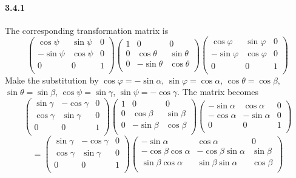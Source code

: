\documentclass[a4paper]{article}
\begin{document}
\paragraph{3.4.1}
The corresponding transformation matrix is 
\[
\begin{pmatrix}
\cos\psi&\sin\psi&0\\
-\sin\psi&\cos\psi&0\\
0&0&1\\
\end{pmatrix}
\begin{pmatrix}
1&0&0\\
0&\cos\theta&\sin\theta\\
0&-\sin\theta&\cos\theta\\
\end{pmatrix}
\begin{pmatrix}
\cos\varphi&\sin\varphi&0\\
-\sin\varphi&\cos\varphi&0\\
0&0&1\\
\end{pmatrix}
\]
Make the substitution by $\cos\varphi=-\sin\alpha$, $\sin\varphi=\cos\alpha$, $\cos\theta=\cos\beta$, $\sin\theta=\sin\beta$, $\cos\psi=\sin\gamma$, $\sin\psi=-\cos\gamma$. The matrix becomes
\[
\begin{pmatrix}
\sin\gamma&-\cos\gamma&0\\
\cos\gamma&\sin\gamma&0\\
0&0&1\\
\end{pmatrix}
\begin{pmatrix}
1&0&0\\
0&\cos\beta&\sin\beta\\
0&-\sin\beta&\cos\beta\\
\end{pmatrix}
\begin{pmatrix}
-\sin\alpha&\cos\alpha&0\\
-\cos\alpha&-\sin\alpha&0\\
0&0&1\\
\end{pmatrix}
\]
\[=
\begin{pmatrix}
\sin\gamma&-\cos\gamma&0\\
\cos\gamma&\sin\gamma&0\\
0&0&1\\
\end{pmatrix}
\begin{pmatrix}
-\sin\alpha&\cos\alpha&0\\
-\cos\beta\cos\alpha&-\cos\beta\sin\alpha&\sin\beta\\
\sin\beta\cos\alpha&\sin\beta\sin\alpha&\cos\beta\\
\end{pmatrix}
\]
\end{document}

